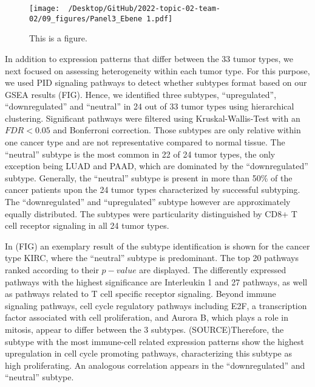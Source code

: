 \documentclass[
  parskip,
  oneside]{scrreprt}
\begin{document}
\begin{figure}
  \texttt{[image: ~/Desktop/GitHub/2022-topic-02-team-02/09\_figures/Panel3\_Ebene 1.pdf]}
  \caption{This is a figure.}
\end{figure}

In addition to expression patterns that differ between the 33 tumor
types, we next focused on assessing heterogeneity within each tumor
type. For this purpose, we used PID signaling pathways to detect whether
subtypes format based on our GSEA results (FIG). Hence, we identified
three subtypes, ``upregulated'', ``downregulated'' and ``neutral'' in 24
out of 33 tumor types using hierarchical clustering. Significant
pathways were filtered using Kruskal-Wallis-Test with an \(FDR < 0.05\)
and Bonferroni correction. Those subtypes are only relative within one
cancer type and are not representative compared to normal tissue. The
``neutral'' subtype is the most common in 22 of 24 tumor types, the only
exception being LUAD and PAAD, which are dominated by the
``downregulated'' subtype. Generally, the ``neutral'' subtype is present
in more than 50\% of the cancer patients upon the 24 tumor types
characterized by successful subtyping. The ``downregulated'' and
``upregulated'' subtype however are approximately equally distributed.
The subtypes were particularity distinguished by CD8+ T cell receptor
signaling in all 24 tumor types.

In (FIG) an exemplary result of the subtype identification is shown for
the cancer type KIRC, where the ``neutral'' subtype is predominant. The
top 20 pathways ranked according to their \(p-value\) are displayed. The
differently expressed pathways with the highest significance are
Interleukin 1 and 27 pathways, as well as pathways related to T cell
specific receptor signaling. Beyond immune signaling pathways, cell
cycle regulatory pathways including E2F, a transcription factor
associated with cell proliferation, and Aurora B, which plays a role in
mitosis, appear to differ between the 3 subtypes. (SOURCE)Therefore, the
subtype with the most immune-cell related expression patterns show the
highest upregulation in cell cycle promoting pathways, characterizing
this subtype as high proliferating. An analogous correlation appears in
the ``downregulated'' and ``neutral'' subtype.
\end{document}
